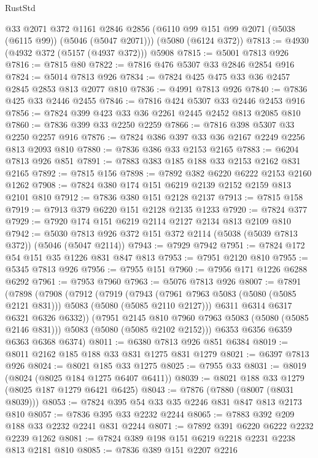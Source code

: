 \begin{lexlean}{RustStd}
\begin{coremodule}
{\begin{coremodule}
{{{{{    @33
    @2071
    @372
    @1161
    @2846
    @2856
    (@6110 @99 @151 @99 @2071 (@5038 (@6115 @99)) (@5046 (@5047 @2071)))
    (@5080 (@6124 @372))
@7813 := @4930 (@4932 @372 (@5157 (@4937 @372))) @5908
@7815 := @5001 @7813 @926
@7816 := @7815 @80
@7822 := @7816 @476 @5307 @33 @2846 @2854 @916
@7824 := @5014 @7813 @926
@7834 := @7824 @425 @475 @33 @36 @2457 @2845 @2853 @813 @2077 @810
@7836 := @4991 @7813 @926
@7840 := @7836 @425 @33 @2446 @2455
@7846 := @7816 @424 @5307 @33 @2446 @2453 @916
@7856 := @7824 @399 @423 @33 @36 @2261 @2445 @2452 @813 @2085 @810
@7860 := @7836 @399 @33 @2250 @2259
@7866 := @7816 @398 @5307 @33 @2250 @2257 @916
@7876 := @7824 @386 @397 @33 @36 @2167 @2249 @2256 @813 @2093 @810
@7880 := @7836 @386 @33 @2153 @2165
@7883 := @6204 @7813 @926 @851
@7891 := @7883 @383 @185 @188 @33 @2153 @2162 @831 @2165
@7892 := @7815 @156
@7898 := @7892 @382 @6220 @6222 @2153 @2160 @1262
@7908 := @7824 @380 @174 @151 @6219 @2139 @2152 @2159 @813 @2101 @810
@7912 := @7836 @380 @151 @2128 @2137
@7913 := @7815 @158
@7919 := @7913 @379 @6220 @151 @2128 @2135 @1233
@7920 := @7824 @377
@7929 := @7920 @174 @151 @6219 @2114 @2127 @2134 @813 @2109 @810
@7942 := @5030 @7813 @926 @372 @151 @372 @2114 (@5038 (@5039 @7813 @372)) (@5046 (@5047 @2114))
@7943 := @7929 @7942
@7951 := @7824 @172 @54 @151 @35 @1226 @831 @847 @813
@7953 := @7951 @2120 @810
@7955 := @5345 @7813 @926
@7956 := @7955 @151
@7960 := @7956 @171 @1226 @6288 @6292
@7961 := @7953 @7960
@7963 := @5076 @7813 @926
@8007 := @7891
    (@7898
      (@7908
        (@7912
          (@7919
            (@7943 (@7961 @7963 @5083 (@5080 (@5085 @2121 @831))) @5083 (@5080 (@5085 @2110 @2127)))
            @6311
            @6314
            @6317
            @6321
            @6326
            @6332))
        (@7951 @2145 @810 @7960 @7963 @5083 (@5080 (@5085 @2146 @831)))
        @5083
        (@5080 (@5085 @2102 @2152)))
      @6353
      @6356
      @6359
      @6363
      @6368
      @6374)
@8011 := @6380 @7813 @926 @851 @6384
@8019 := @8011 @2162 @185 @188 @33 @831 @1275 @831 @1279
@8021 := @6397 @7813 @926
@8024 := @8021 @185 @33 @1275
@8025 := @7955 @33
@8031 := @8019 (@8024 (@8025 @184 @1275 @6407 @6411))
@8039 := @8021 @188 @33 @1279 (@8025 @187 @1279 @6421 @6425)
@8043 := @7876 (@7880 (@8007 (@8031 @8039)))
@8053 := @7824 @395 @54 @33 @35 @2246 @831 @847 @813 @2173 @810
@8057 := @7836 @395 @33 @2232 @2244
@8065 := @7883 @392 @209 @188 @33 @2232 @2241 @831 @2244
@8071 := @7892 @391 @6220 @6222 @2232 @2239 @1262
@8081 := @7824 @389 @198 @151 @6219 @2218 @2231 @2238 @813 @2181 @810
@8085 := @7836 @389 @151 @2207 @2216
}}}}}
\end{coremodule}}
\end{coremodule}
\end{lexlean}
